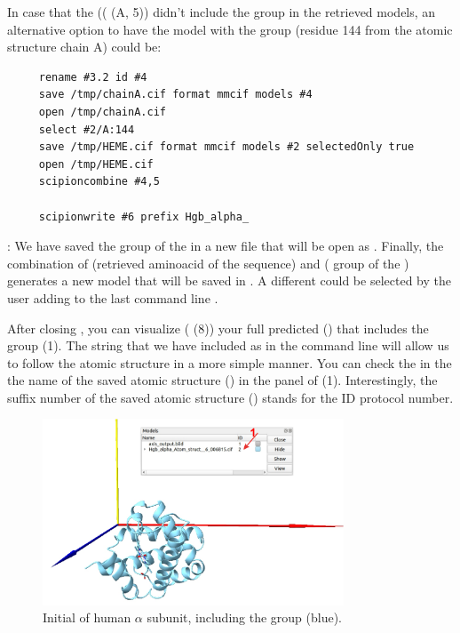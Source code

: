 In case that the   (( (A, 5)) didn't include the  group in the retrieved models, an alternative option to have the model with the  group (residue 144 from the atomic structure  chain A) could be:
\begin{verbatim}
     rename #3.2 id #4
     save /tmp/chainA.cif format mmcif models #4
     open /tmp/chainA.cif
     select #2/A:144
     save /tmp/HEME.cif format mmcif models #2 selectedOnly true 
     open /tmp/HEME.cif
     scipioncombine #4,5

     scipionwrite #6 prefix Hgb_alpha_
 \end{verbatim}
 
 : We have saved the  group of the   in a new file that will be open as  . Finally, the combination of   (retrieved aminoacid  of the  sequence) and  ( group of the  ) generates a new model  that will be saved in \scipion. A different  could be selected by the user adding to the last command line .


After closing \chimera, you can visualize ( (8)) your full predicted  () that includes the  group (1).  The string that we have included as  in the command line  will allow us to follow the atomic structure in a more simple manner. You can check the  in the the name of the saved atomic structure () in the  panel of  (1). Interestingly, the suffix number of the saved atomic structure () stands for the ID protocol number.
 
 \begin{figure}[H]
  \centering 
  \captionsetup{width=.9\linewidth} 
  \includegraphics[width=0.80\textwidth]{Images/Fig16}
  \caption{Initial  of human  $\alpha$ subunit, including the  group (blue).}
  \label{fig:chimera_model}
  \end{figure}
  
